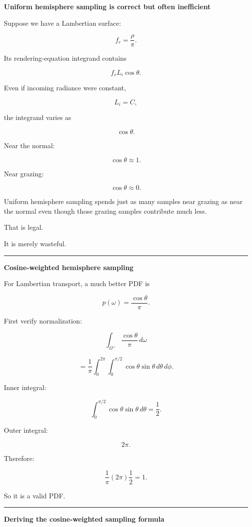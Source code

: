 \textbf{Uniform hemisphere sampling is correct but often inefficient}

Suppose we have a Lambertian surface:

\[
f_r=\frac{\rho}{\pi}.
\]

Its rendering-equation integrand contains

\[
f_rL_i\cos\theta.
\]

Even if incoming radiance were constant,

\[
L_i=C,
\]

the integrand varies as

\[
\cos\theta.
\]

Near the normal:

\[
\cos\theta\approx1.
\]

Near grazing:

\[
\cos\theta\approx0.
\]

Uniform hemisphere sampling spends just as many samples near grazing as near the normal even though those grazing samples contribute much less.

That is legal.

It is merely wasteful.

\begin{center}\rule{0.5\linewidth}{0.5pt}\end{center}

\textbf{Cosine-weighted hemisphere sampling}

For Lambertian transport, a much better PDF is

\[
\boxed{
p(\omega)
=
\frac{\cos\theta}{\pi}.
}
\]

First verify normalization:

\[
\int_{\Omega^+}
\frac{\cos\theta}{\pi}
\,d\omega
\]

\[
=
\frac1\pi
\int_0^{2\pi}
\int_0^{\pi/2}
\cos\theta
\sin\theta
\,d\theta\,d\phi.
\]

Inner integral:

\[
\int_0^{\pi/2}
\cos\theta\sin\theta\,d\theta
=
\frac12.
\]

Outer integral:

\[
2\pi.
\]

Therefore:

\[
\frac1\pi
(2\pi)
\frac12
=
1.
\]

So it is a valid PDF.

\begin{center}\rule{0.5\linewidth}{0.5pt}\end{center}

\textbf{Deriving the cosine-weighted sampling formula}

